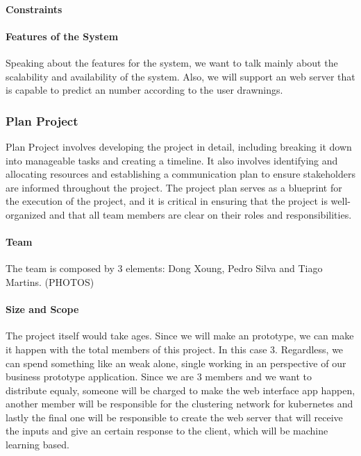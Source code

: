 \paragraph{Constraints}

\paragraph{Features of the System}
 Speaking about the features for the system, we want to talk mainly about the scalability and availability of the system. Also, we will support an web server that is capable to predict an number according to the user drawnings.

\subsubsection{Plan Project}
Plan Project involves developing the project in detail, including breaking it down into manageable tasks and creating a timeline. It also involves identifying and allocating resources and establishing a communication plan to ensure stakeholders are informed throughout the project. The project plan serves as a blueprint for the execution of the project, and it is critical in ensuring that the project is well-organized and that all team members are clear on their roles and responsibilities.

\paragraph{Team}
 The team is composed by 3 elements: Dong Xoung, Pedro Silva and Tiago Martins.
 (PHOTOS)

\paragraph{Size and Scope} 
 The project itself would take ages. Since we will make an prototype, we can make it happen with the total members of this project. In this case 3. Regardless, we can spend something like an weak alone, single working in an perspective of our business prototype application. Since we are 3 members and we want to distribute equaly, someone will be charged to make the web interface app happen, another member will be responsible for the clustering network for kubernetes and lastly the final one will be responsible to create the web server that will receive the inputs and give an certain response to the client, which will be machine learning based.

